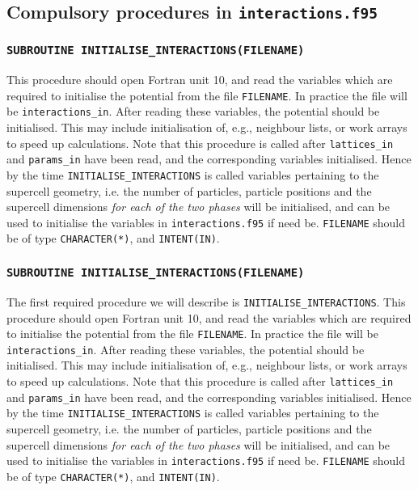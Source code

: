 \documentclass{report}
\begin{document}
\subsection{Compulsory procedures in \texttt{interactions.f95}}

\subsubsection{\texttt{SUBROUTINE INITIALISE\_INTERACTIONS(FILENAME)}}
This procedure should open Fortran unit 10, and read 
the variables which are required to initialise the potential from the file \verb|FILENAME|.
In practice the file will be \texttt{interactions\_in}. After reading these variables, the potential should be initialised. This may include
initialisation of, e.g., neighbour lists, or work arrays to speed up calculations. Note that this procedure is called after \texttt{lattices\_in}
and \texttt{params\_in} have been read, and the corresponding variables initialised. Hence by the time \verb|INITIALISE_INTERACTIONS| is called 
variables pertaining to the supercell geometry, i.e. the number of particles, particle positions and the supercell dimensions 
\emph{for each of the two phases} will be initialised, and can be used to initialise the variables in \texttt{interactions.f95} if need be.
\verb|FILENAME| should be of type \verb|CHARACTER(*)|, and \verb|INTENT(IN)|.

\subsubsection{\texttt{SUBROUTINE INITIALISE\_INTERACTIONS(FILENAME)}}
The first required procedure we will describe is \verb|INITIALISE_INTERACTIONS|. This procedure should open Fortran unit 10, and read 
the variables which are required to initialise the potential from the file \verb|FILENAME|.
In practice the file will be \texttt{interactions\_in}. After reading these variables, the potential should be initialised. This may include
initialisation of, e.g., neighbour lists, or work arrays to speed up calculations. Note that this procedure is called after \texttt{lattices\_in}
and \texttt{params\_in} have been read, and the corresponding variables initialised. Hence by the time \verb|INITIALISE_INTERACTIONS| is called 
variables pertaining to the supercell geometry, i.e. the number of particles, particle positions and the supercell dimensions 
\emph{for each of the two phases} will be initialised, and can be used to initialise the variables in \texttt{interactions.f95} if need be.
\verb|FILENAME| should be of type \verb|CHARACTER(*)|, and \verb|INTENT(IN)|.
\end{document}
